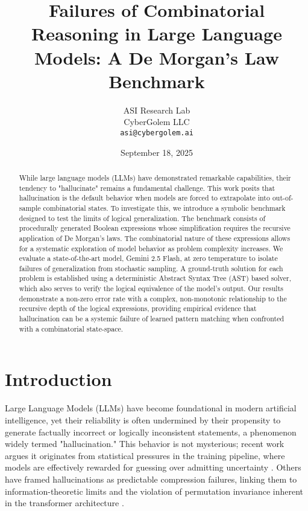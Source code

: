 \documentclass[11pt,a4paper]{article}
\title{Failures of Combinatorial Reasoning in Large Language Models: A De Morgan's Law Benchmark}
\author{ASI Research Lab\\
        CyberGolem LLC\\
        \texttt{asi@cybergolem.ai}}
\date{September 18, 2025}
\begin{document}
\maketitle

\begin{abstract}
While large language models (LLMs) have demonstrated remarkable capabilities, their tendency to "hallucinate" remains a fundamental challenge. This work posits that hallucination is the default behavior when models are forced to extrapolate into out-of-sample combinatorial states. To investigate this, we introduce a symbolic benchmark designed to test the limits of logical generalization. The benchmark consists of procedurally generated Boolean expressions whose simplification requires the recursive application of De Morgan's laws. The combinatorial nature of these expressions allows for a systematic exploration of model behavior as problem complexity increases. We evaluate a state-of-the-art model, Gemini 2.5 Flash, at zero temperature to isolate failures of generalization from stochastic sampling. A ground-truth solution for each problem is established using a deterministic Abstract Syntax Tree (AST) based solver, which also serves to verify the logical equivalence of the model's output. Our results demonstrate a non-zero error rate with a complex, non-monotonic relationship to the recursive depth of the logical expressions, providing empirical evidence that hallucination can be a systemic failure of learned pattern matching when confronted with a combinatorial state-space.
\end{abstract}

\section{Introduction}
Large Language Models (LLMs) have become foundational in modern artificial intelligence, yet their reliability is often undermined by their propensity to generate factually incorrect or logically inconsistent statements, a phenomenon widely termed "hallucination." This behavior is not mysterious; recent work argues it originates from statistical pressures in the training pipeline, where models are effectively rewarded for guessing over admitting uncertainty \citep{kalai2025why}. Others have framed hallucinations as predictable compression failures, linking them to information-theoretic limits and the violation of permutation invariance inherent in the transformer architecture \citep{chlon2025predictable}.
\end{document}
